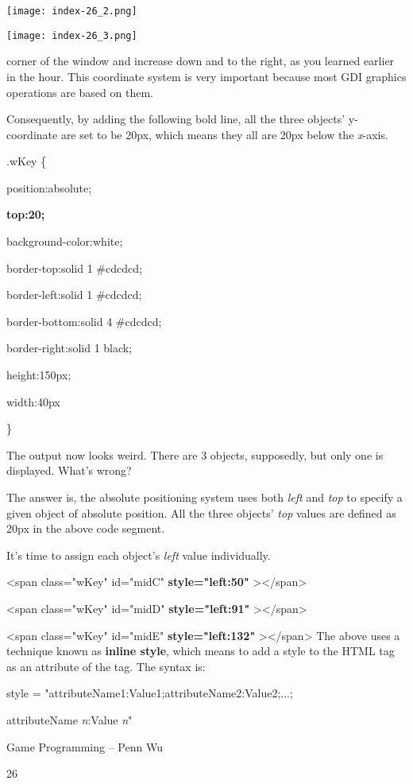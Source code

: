 \documentclass[
]{article}
\begin{document}
\texttt{[image: index-26\_2.png]}

\texttt{[image: index-26\_3.png]}

corner of the window and increase down and to the right, as you learned
earlier in the hour. This coordinate system is very important because
most GDI graphics operations are based on them.

Consequently, by adding the following bold line, all the three objects'
y-coordinate are set to be 20px, which means they all are 20px below the
\emph{x}-axis.

.wKey \{

position:absolute;

\textbf{top:20;}

background-color:white;

border-top:solid 1 \#cdcdcd;

border-left:solid 1 \#cdcdcd;

border-bottom:solid 4 \#cdcdcd;

border-right:solid 1 black;

height:150px;

width:40px

\}

The output now looks weird. There are 3 objects, supposedly, but only
one is displayed. What's wrong?

The answer is, the absolute positioning system uses both \emph{left} and
\emph{top} to specify a given object of absolute position. All the three
objects' \emph{top} values are defined as 20px in the above code
segment.

It's time to assign each object's \emph{left} value individually.

\textless span class="wKey" id="midC" \textbf{style="left:50"}
\textgreater\textless/span\textgreater{}

\textless span class="wKey" id="midD" \textbf{style="left:91"}
\textgreater\textless/span\textgreater{}

\textless span class="wKey" id="midE" \textbf{style="left:132"}
\textgreater\textless/span\textgreater{} The above uses a technique
known as \textbf{inline style}, which means to add a style to the HTML
tag as an attribute of the tag. The syntax is:

style = "attributeName1:Value1;attributeName2:Value2;...;

attributeName \emph{n}:Value \emph{n}"

Game Programming -- Penn Wu

26
\end{document}
